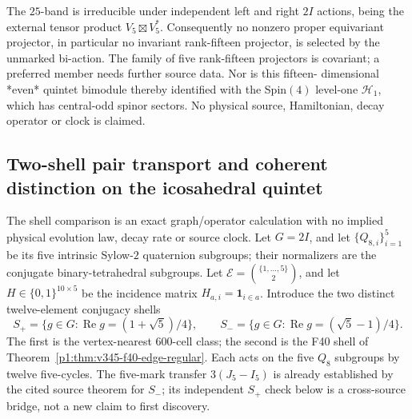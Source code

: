 \documentclass[11pt]{article}
\begin{document}
\begin{remark}
The $25$-band is irreducible under independent left and right $2I$
actions, being the external tensor product $V_5\boxtimes V_5^*$.
Consequently no nonzero proper equivariant projector, in particular
no invariant rank-fifteen projector, is selected by the unmarked
bi-action.  The family of five rank-fifteen projectors is covariant;
a preferred member needs further source data.  Nor is this fifteen-
dimensional *even* quintet bimodule thereby identified with the
Spin$(4)$ level-one $\mathcal H_1$, which has central-odd spinor
sectors.  No physical source, Hamiltonian, decay operator or clock is
claimed.
\end{remark}


\subsection{Two-shell pair transport and coherent distinction on the icosahedral quintet}
The shell comparison is an exact graph/operator calculation with no implied
physical evolution law, decay rate or source clock.
\label{p1b:sec:two-shell-coherent-transport}
Let $G=2I$, and let $\{Q_{8,i}\}_{i=1}^5$ be its five intrinsic Sylow-$2$
quaternion subgroups; their normalizers are the conjugate binary-tetrahedral
subgroups.  Let $\mathscr E=\binom{\{1,\ldots,5\}}2$, and let
$H\in\{0,1\}^{10\times5}$ be the incidence matrix
$H_{a,i}=\mathbf 1_{i\in a}$.  Introduce the two distinct twelve-element
conjugacy shells
\[
 S_+=\{g\in G:\operatorname{Re}g=(1+\sqrt5)/4\},\qquad
 S_-=\{g\in G:\operatorname{Re}g=(\sqrt5-1)/4\}.
\]
The first is the vertex-nearest $600$-cell class; the second is the
F40 shell of Theorem~\ref{p1:thm:v345-f40-edge-regular}.  Each acts on the
five $Q_8$ subgroups by twelve five-cycles.  The five-mark transfer
$3(J_5-I_5)$ is already established by the cited source theorem for
$S_-$; its independent $S_+$ check below is a cross-source bridge, not a
new claim to first discovery.
\end{document}
